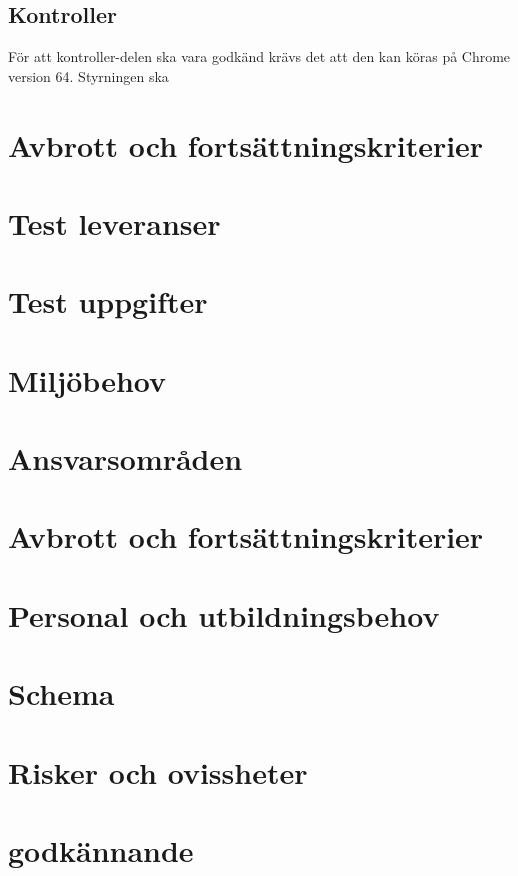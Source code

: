 \documentclass[10pt]{article}
\begin{document}
	\subsection{Kontroller}
		För att kontroller-delen ska vara godkänd krävs det att den kan köras på Chrome version 64. Styrningen ska 
\section{Avbrott och fortsättningskriterier}
\section{Test leveranser}
\section{Test uppgifter}
\section{Miljöbehov}
\section{Ansvarsområden}
\section{Avbrott och fortsättningskriterier}
\section{Personal och utbildningsbehov}
\section{Schema}
\section{Risker och ovissheter}
\section{godkännande}
\end{document}
